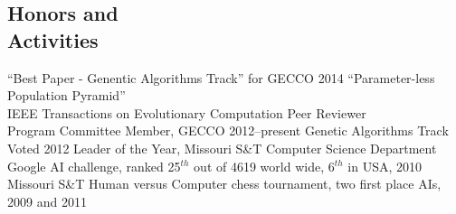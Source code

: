 \documentclass[margin,line]{resume}
\begin{document}
\begin{resume}
    \section{\mysidestyle Honors and\\Activities}
    ``Best Paper - Genentic Algorithms Track'' for GECCO 2014 ``Parameter-less Population Pyramid''\\%
    IEEE Transactions on Evolutionary Computation Peer Reviewer\\%
    Program Committee Member, GECCO 2012--present Genetic Algorithms Track \vspace{1mm}\\%
    Voted 2012 Leader of the Year, Missouri S\&T Computer Science Department \vspace{1mm}\\%
    Google AI challenge, ranked 25$^{th}$ out of 4619 world wide, 6$^{th}$ in USA, 2010 \vspace{1mm}\\%
    Missouri S\&T Human versus Computer chess tournament, two first place AIs, 2009 and 2011 \vspace{1mm}\\%
\begin{comment}    
    ACM SIG-Game Competition testing and balancing using evolving AI, 2009--present \vspace{1mm}\\%
    ACM SIG-Game first place AI, 2008          \vspace{1mm}\\%
    University of Illinois at Urbana-Champaign MechMania AI competition second place AI, 2007  \vspace{1mm}\\%
    Missouri S\&T Alumni Scholarship 2006--2010             %

    \section{\mysidestyle Programming} 
    Python, C, C++, C\#, Matlab, Linux shell scripting, \LaTeX, Java, CUDA.


\end{comment}
\end{resume}
\end{document}
